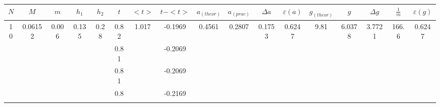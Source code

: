 \documentclass[a4paper,12pt]{article}
\begin{document}
\begin{landscape}
\begin{table}[]
\begin{tabular}{|c|c|c|c|c|c|c|c|c|c|c|c|c|c|c|c|c|}
\hline
$N$                  & $M$                       & $m$                     & $h_1$                   & $h_2$                  & $t$  & $<t>$                   & $t-<t>$ & $a_{(theor)}$               & $a_{(prac)}$                & $\Delta a$                & $\varepsilon(a)$          & $g_{(theor)}$             & $g$                       & $\Delta g$                & $\frac 1m$                 & $\varepsilon(g)$          \\ \hline
\multirow{20}{*}{10} & \multirow{20}{*}{0.06152} & \multirow{20}{*}{0.006} & \multirow{10}{*}{0.135} & \multirow{10}{*}{0.28} & 0.82 & \multirow{20}{*}{1.017} & -0.1969 & \multirow{20}{*}{0.4561} & \multirow{10}{*}{0.2807} & \multirow{10}{*}{0.1753}  & \multirow{10}{*}{0.6247}  & \multirow{20}{*}{9.81} & \multirow{10}{*}{6.0378}  & \multirow{10}{*}{3.7721}  & \multirow{20}{*}{166.6} & \multirow{10}{*}{0.6247}  \\ \cline{6-6} \cline{8-8}
                     &                           &                         &                         &                        & 0.81 &                         & -0.2069 &                          &                          &                           &                           &                        &                           &                           &                            &                           \\ \cline{6-6} \cline{8-8}
                     &                           &                         &                         &                        & 0.81 &                         & -0.2069 &                          &                          &                           &                           &                        &                           &                           &                            &                           \\ \cline{6-6} \cline{8-8}
                     &                           &                         &                         &                        & 0.8  &                         & -0.2169 &                          &                          &                           &                           &                        &                           &                           &                            &                           \\ \cline{6-6} \cline{8-8}

\end{tabular}
\end{table}
\end{landscape}
\end{document}

